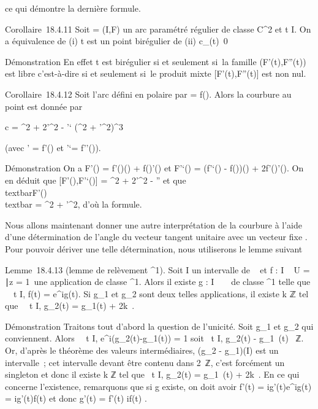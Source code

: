 \documentclass[]{article}
\begin{document}
ce qui démontre la dernière formule.

Corollaire~18.4.11 Soit \Gamma = (I,F) un arc paramétré régulier de classe
C^2 et t \in I. On a équivalence de (i) t est un point
birégulier de \Gamma (ii) c\_\Gamma(t)\neq~0

Démonstration En effet t est birégulier si et seulement si~la famille
(F'(t),F''(t)) est libre c'est-à-dire si et seulement si~le produit
mixte {[}F'(t),F''(t){]} est non nul.

Corollaire~18.4.12 Soit \Gamma l'arc défini en polaire par \rho = f(\theta). Alors la
courbure au point \theta est donnée par

c = \rho^2 + 2\rho'^2 - \rho\rho'`\over
(\rho^2 + \rho'^2)^3

(avec \rho' = f'(\theta) et \rho'`= f''(\theta)).

Démonstration On a F'(\theta) = f'(\theta)\vecu(\theta) +
f(\theta)\vecu'(\theta) et F'`(\theta) = (f'`(\theta) -
f(\theta))\vecu(\theta) + 2f'(\theta)\vecu'(\theta).
On en déduit que {[}F'(\theta),F'`(\theta){]} = \rho^2 + 2\rho'^2
- \rho\rho'' et que \\textbar{}F'(\theta)\\textbar{}
= \sqrt\rho^2  + \rho'^2, d'où la
formule.

Nous allons maintenant donner une autre interprétation de la courbure à
l'aide d'une détermination de l'angle \phi du vecteur tangent unitaire
\vect avec un vecteur fixe \vec\imath.
Pour pouvoir dériver une telle détermination, nous utiliserons le lemme
suivant

Lemme~18.4.13 (lemme de relèvement ^1). Soit I un intervalle
de ~ et f : I \rightarrow~ U = \z \in
{}∣\textbar{}z\textbar{} = 1\
une application de classe ^1. Alors il existe g : I \rightarrow~ ~ de
classe \mathcal{C}^1 telle que \forall~~t \in I, f(t) =
e^ig(t). Si g\_1 et g\_2 sont deux telles
applications, il existe k \in ℤ tel que \forall~~t \in I,
g\_2(t) = g\_1(t) + 2k\pi~.

Démonstration Traitons tout d'abord la question de l'unicité. Soit
g\_1 et g\_2 qui conviennent. Alors
\forall~~t \in I,
e^i(g\_2(t)-g\_1(t)) = 1 soit
\forall~t \in I, g\_2(t) - g\_1~(t) \pi~ℤ. Or, d'après le théorème des valeurs intermédiaires, (g\_2 -
g\_1)(I) est un intervalle~; cet intervalle devant être contenu
dans 2\pi~ℤ, c'est forcément un singleton et donc il existe k \in ℤ tel que
\forall~t \in I, g\_2(t) = g\_1~(t) +
2k\pi~. En ce qui concerne l'existence, remarquons que si g existe, on doit
avoir f'(t) = ig'(t)e^ig(t) = ig'(t)f(t) et donc g'(t) =
f'(t) \over if(t) .
\end{document}
